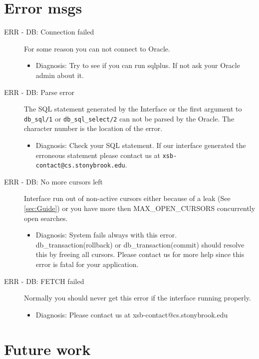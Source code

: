\section{Error msgs}

\begin{description}
\item[ERR - DB: Connection failed] For some reason you can not connect
	to Oracle.
	\begin{itemize}
	\item	Diagnosis: Try to see if you can run sqlplus.
		If not ask your Oracle admin about it.
	\end{itemize}

\item[ERR - DB: Parse error] The SQL statement generated by the
	Interface or the first argument to {\tt db\_sql/1} or 
	{\tt db\_sql\_select/2} can not be parsed by the Oracle.
	The character number is the location of the error. 
	\begin{itemize}
	\item	Diagnosis: Check your SQL statement.  If our interface
		generated the erroneous statement please contact us at
		{\tt xsb-contact@cs.stonybrook.edu}.
	\end{itemize}

\item[ERR - DB: No more cursors left] Interface run out of non-active
cursors either because of a leak (See \ref{sec:Guide}) or you have more then MAX\_OPEN\_CURSORS concurrently open
searches.
\begin{itemize}

\item Diagnosis: System fails always with this error.  db\_transaction(rollback) or
	   db\_transaction(commit) should resolve this by freeing all cursors.
	   Please contact us for more help since this error is fatal for your
	   application.
\end{itemize}

\item[ERR - DB: FETCH failed] Normally you should never get this error if the 
interface running properly.
\begin{itemize}

\item Diagnosis: Please contact us at xsb-contact@cs.stonybrook.edu
\end{itemize}

\end{description}


\section{Future work}



